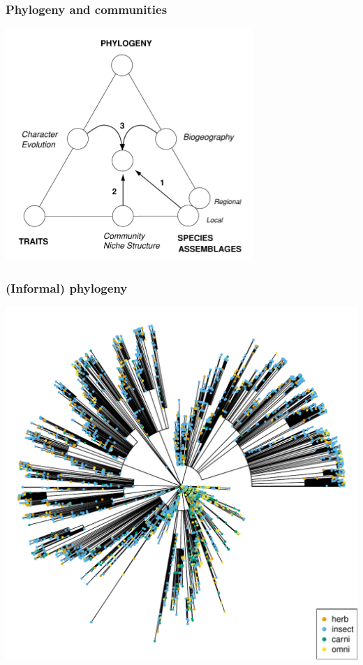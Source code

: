 \documentclass{beamer}
\begin{document}
\begin{frame}
  \frametitle{Phylogeny and communities}

  \begin{center}
    \includegraphics[height = 0.8\textheight, width = \textwidth,  keepaspectratio = true]{figure/webb}

    \tiny{}
  \end{center}
\end{frame}

\begin{frame}
  \frametitle{(Informal) phylogeny}
  \begin{center}
    \includegraphics[height = 0.8\textheight, width = \textwidth,  keepaspectratio = true]{figure/na_phylo_diet}
  \end{center}
\end{frame}
\end{document}
